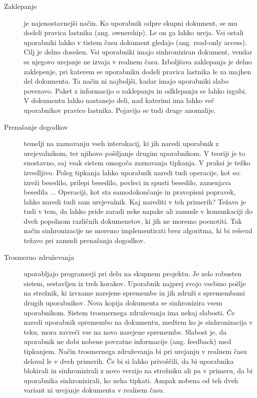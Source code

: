 \documentclass[a4paper, 12pt, twoside]{book}
\begin{document}
\begin{description}
	\item[Zaklepanje] je najenostavnejši način. Ko uporabnik odpre skupni dokument, se mu dodeli pravica lastnika (ang. ownership). Le on ga lahko ureja. Vsi ostali uporabniki lahko v tistem času dokument gledajo (ang. read-only access). Cilj je delno dosežen. Vsi uporabniki imajo sinhroniziran dokument, vendar se njegovo urejanje ne izvaja v realnem času. Izboljšava zaklepanja je delno zaklepenje, pri katerem se uporabniku dodeli pravica lastnika le za majhen del dokumenta. Ta način ni najboljši, kadar imajo uporabniki slabo povezavo. Paket z informacijo o zaklepanju in odklepanju se lahko izgubi. V dokumentu lahko nastanejo deli, nad katerimi ima lahko več uporabnikov pravico lastnika. Pojavijo se tudi druge anomalije.
	\item[Prenašanje dogodkov] temelji na zaznavanju vseh interakacij, ki jih naredi uporabnik z urejevalnikom, ter njihovo pošiljanje drugim uporabnikom. V teoriji je to enostavno, saj vsak sistem omogoča zaznavanja tipkanja. V praksi je težko izvedljivo. Poleg tipkanja lahko uporabnik naredi tudi operacije, kot so: izreži besedilo, prilepi besedilo, povleci in spusti besedilo, zamenjava besedila ... Operaciji, kot sta samodokončanje in pravopisni popravek, lahko naredi tudi sam urejevalnik. Kaj narediti v teh primerih? Težava je tudi v tem, da lahko pride zaradi neke napake ali zamude v komunkaciji do dveh popolnom različnih dokumenetov, ki jih ne moremo poenotiti. Tak način sinhronizacije ne moremo implementirati brez algoritma, ki bi reševal težavo pri zamudi prenašanja dogodkov.
	\item[Trosmerno združevanja] uporabljajo programerji pri delu na skupnem projektu. Je zelo robusten sistem, sestavljen iz treh korakov. Uporabnik najprej svojo vsebino pošlje na strežnik, ki izvzame narejene spremembe in jih združi s spremembami drugih uporabnikov. Nova kopija dokumenta se sinhronizira vsem uporabnikom. Sistem trosmernega združevanja ima nekaj slabosti. Če naredi uporabnik spremembo na dokumentu, medtem ko je sinhronizacija v teku, mora zavreči vse na novo narejene spremembe. Slabost je, da uporabnik ne dobi nobene povratne informacije (ang. feedback) med tipkanjem. Način trosmernega združevanja bi pri urejanju v realnem času deloval le v dveh primerih. Če bi si lahko privoščili, da bi uporabnika blokirali in sinhronizirali z novo verzijo na strežniku ali pa v primeru, da bi uporabnika sinhronizirali, ko neha tipkati. Ampak nobena od teh dveh variant ni urejanje dokumenta v realnem času.
\end{description}
\end{document}
